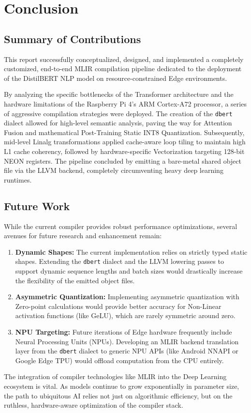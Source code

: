 \chapter{Conclusion}
\label{ch:conclusion}

\section{Summary of Contributions}
This report successfully conceptualized, designed, and implemented a completely customized, end-to-end MLIR compilation pipeline dedicated to the deployment of the DistilBERT NLP model on resource-constrained Edge environments. 

By analyzing the specific bottlenecks of the Transformer architecture and the hardware limitations of the Raspberry Pi 4's ARM Cortex-A72 processor, a series of aggressive compilation strategies were deployed. The creation of the \texttt{dbert} dialect allowed for high-level semantic analysis, paving the way for Attention Fusion and mathematical Post-Training Static INT8 Quantization. Subsequently, mid-level Linalg transformations applied cache-aware loop tiling to maintain high L1 cache coherency, followed by hardware-specific Vectorization targeting 128-bit NEON registers. The pipeline concluded by emitting a bare-metal shared object file via the LLVM backend, completely circumventing heavy deep learning runtimes.

\section{Future Work}
While the current compiler provides robust performance optimizations, several avenues for future research and enhancement remain:
\begin{enumerate}
    \item \textbf{Dynamic Shapes:} The current implementation relies on strictly typed static shapes. Extending the \texttt{dbert} dialect and the LLVM lowering passes to support dynamic sequence lengths and batch sizes would drastically increase the flexibility of the emitted object files.
    \item \textbf{Asymmetric Quantization:} Implementing asymmetric quantization with Zero-point calculations would provide better accuracy for Non-Linear activation functions (like GeLU), which are rarely symmetric around zero.
    \item \textbf{NPU Targeting:} Future iterations of Edge hardware frequently include Neural Processing Units (NPUs). Developing an MLIR backend translation layer from the \texttt{dbert} dialect to generic NPU APIs (like Android NNAPI or Google Edge TPU) would offload computation from the CPU entirely.
\end{enumerate}

The integration of compiler technologies like MLIR into the Deep Learning ecosystem is vital. As models continue to grow exponentially in parameter size, the path to ubiquitous AI relies not just on algorithmic efficiency, but on the ruthless, hardware-aware optimization of the compiler stack.


